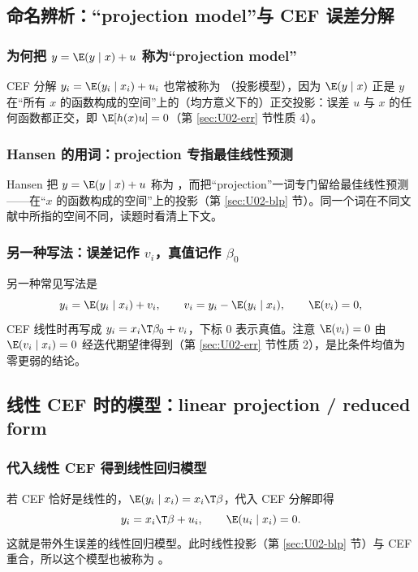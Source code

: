 \subsection{命名辨析：“projection model”与 CEF 误差分解}

\subsubsection{为何把 \texorpdfstring{$y=\E(y\mid x)+u$}{y = E(y|x) + u} 称为“projection model”}

CEF 分解 $y_i=\E(y_i\mid x_i)+u_i$ 也常被称为 （投影模型），因为 $\E(y\mid x)$ 正是 $y$ 在“所有 $x$ 的函数构成的空间”上的（均方意义下的）正交投影：误差 $u$ 与 $x$ 的任何函数都正交，即 $\E[h(x)u]=0$（第 \ref{sec:U02-err} 节性质 4）。

\subsubsection{Hansen 的用词：projection 专指最佳线性预测}

Hansen 把 $y=\E(y\mid x)+u$ 称为 ，而把“projection”一词专门留给最佳线性预测——在“$x$ 的函数构成的空间”上的投影（第 \ref{sec:U02-blp} 节）。同一个词在不同文献中所指的空间不同，读题时看清上下文。

\subsubsection{另一种写法：误差记作 \texorpdfstring{$v_i$}{v\_i}，真值记作 \texorpdfstring{$\beta_0$}{beta\_0}}

另一种常见写法是
\[
y_i=\E(y_i\mid x_i)+v_i,\qquad v_i=y_i-\E(y_i\mid x_i),\qquad \E(v_i)=0,
\]
CEF 线性时再写成 $y_i=x_i\T\beta_0+v_i$，下标 0 表示真值。注意 $\E(v_i)=0$ 由 $\E(v_i\mid x_i)=0$ 经迭代期望律得到（第 \ref{sec:U02-err} 节性质 2），是比条件均值为零更弱的结论。

\subsection{线性 CEF 时的模型：linear projection / reduced form}

\subsubsection{代入线性 CEF 得到线性回归模型}

若 CEF 恰好是线性的，$\E(y_i\mid x_i)=x_i\T\beta$，代入 CEF 分解即得
\[
y_i=x_i\T\beta+u_i,\qquad \E(u_i\mid x_i)=0.
\]
这就是带外生误差的线性回归模型。此时线性投影（第 \ref{sec:U02-blp} 节）与 CEF 重合，所以这个模型也被称为 。

